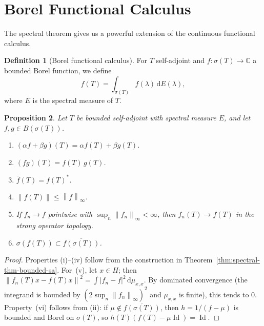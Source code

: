 \documentclass[a4paper,12pt]{book}
\DeclareMathOperator{\Id}{Id}
\newcommand{\C}{\mathbb{C}}
\newcommand{\dd}{\mathrm{d}}
\newcommand{\norm}[1]{\left\| #1 \right\|}
\newcommand{\abs}[1]{\left| #1 \right|}
\theoremstyle{definition}
\newtheorem{definition}{Definition}[chapter]
\theoremstyle{plain}
\newtheorem{proposition}[definition]{Proposition}
\theoremstyle{remark}
\begin{document}

\section{Borel Functional Calculus}\label{sec:borel-func-calc}


The spectral theorem gives us a powerful extension of the continuous functional
calculus.

\begin{definition}[Borel functional calculus]\label{def:borel-func-calc}
For $T$ self-adjoint and $f \colon \sigma(T) \to \C$ a bounded Borel function,
we define
\[
  f(T) = \int_{\sigma(T)} f(\lambda)\, \dd E(\lambda),
\]
where $E$ is the spectral measure of $T$.
\end{definition}

\begin{proposition}\label{prop:borel-calc-properties}
Let $T$ be bounded self-adjoint with spectral measure $E$, and let
$f, g \in B(\sigma(T))$.
\begin{enumerate}[label=(\roman*)]
  \item $(\alpha f + \beta g)(T) = \alpha f(T) + \beta g(T)$.
  \item $(fg)(T) = f(T)\, g(T)$.
  \item $\bar{f}(T) = f(T)^*$.
  \item $\norm{f(T)} \le \norm{f}_\infty$.
  \item If $f_n \to f$ pointwise with $\sup_n \norm{f_n}_\infty < \infty$, then
        $f_n(T) \to f(T)$ in the strong operator topology.
  \item $\sigma(f(T)) \subset \overline{f(\sigma(T))}$.
\end{enumerate}
\end{proposition}

\begin{proof}
Properties (i)--(iv) follow from the construction in Theorem~\ref{thm:spectral-thm-bounded-sa}.
For~(v), let $x \in H$; then
$\norm{f_n(T)x - f(T)x}^2 = \int \abs{f_n - f}^2\, \dd\mu_{x,x}$.
By dominated convergence (the integrand is bounded by $(2\sup_n\norm{f_n}_\infty)^2$
and $\mu_{x,x}$ is finite), this tends to $0$.
Property~(vi) follows from (ii): if $\mu \notin \overline{f(\sigma(T))}$, then
$h = 1/(f - \mu)$ is bounded and Borel on $\sigma(T)$, so
$h(T)(f(T) - \mu\Id) = \Id$.
\end{proof}
\end{document}
